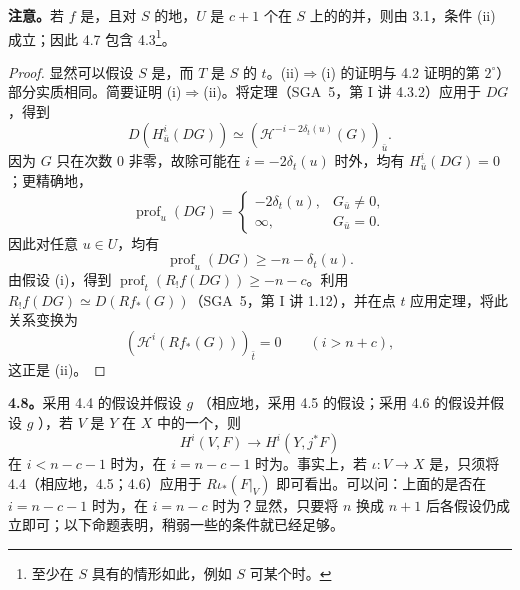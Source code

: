 \textbf{注意。}若 $f$ 是，且对 $S$ 的地，$U$ 是 $c+1$ 个在 $S$ 上的的并，则由 3.1，条件 (ii) 成立；因此 4.7 包含 4.3\footnote{至少在 $S$ 具有的情形如此，例如 $S$ 可某个时。}。
\begin{proof}
显然可以假设 $S$ 是，而 $T$ 是 $S$ 的 $t$。(ii)$\Rightarrow$(i) 的证明与 4.2 证明的第 $2^\circ$）部分实质相同。简要证明 (i)$\Rightarrow$(ii)。将定理（SGA~5，第 I 讲 4.3.2）应用于 $DG$，得到
\[
D(H^i_{\bar u}(DG))\simeq
(\mathcal H^{-i-2\delta_t(u)}(G))_{\bar u}.
\]
因为 $G$ 只在次数 $0$ 非零，故除可能在 $i=-2\delta_t(u)$ 时外，均有 $H^i_{\bar u}(DG)=0$；更精确地，
\[
\operatorname{prof}_u(DG)=
\begin{cases}
-2\delta_t(u),&G_{\bar u}\ne0,\\
\infty,&G_{\bar u}=0.
\end{cases}
\]
因此对任意 $u\in U$，均有
\[
\operatorname{prof}_u(DG)\geq-n-\delta_t(u).
\]
由假设 (i)，得到 $\operatorname{prof}_t(R_!f(DG))\geq-n-c$。利用 $R_!f(DG)\simeq D(Rf_*(G))$（SGA~5，第 I 讲 1.12），并在点 $t$ 应用定理，将此关系变换为
\[
(\mathcal H^i(Rf_*(G)))_{\bar t}=0\qquad(i>n+c),
\]
这正是 (ii)。
\end{proof}

\textbf{4.8。}采用 4.4 的假设并假设 $g$ （相应地，采用 4.5 的假设；采用 4.6 的假设并假设 $g$ ），若 $V$ 是 $Y$ 在 $X$ 中的一个，则
\[
H^i(V,F)\longrightarrow H^i(Y,j^*F)
\]
在 $i<n-c-1$ 时为，在 $i=n-c-1$ 时为。事实上，若 $\iota:V\to X$ 是，只须将 4.4（相应地，4.5；4.6）应用于 $R\iota_*(F|_V)$ 即可看出。可以问：上面的是否在 $i=n-c-1$ 时为，在 $i=n-c$ 时为？显然，只要将 $n$ 换成 $n+1$ 后各假设仍成立即可；以下命题表明，稍弱一些的条件就已经足够。

